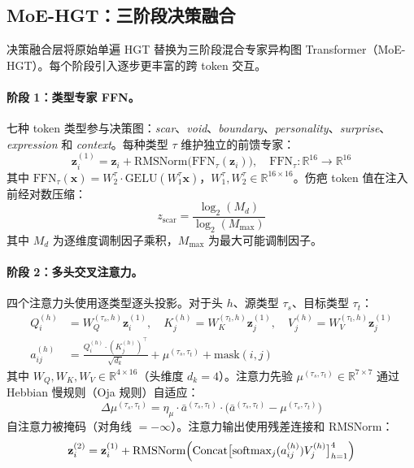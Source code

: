 \documentclass[11pt]{article}
\begin{document}
\subsection{MoE-HGT：三阶段决策融合}

决策融合层将原始单遍 HGT 替换为三阶段混合专家异构图 Transformer（MoE-HGT）。每个阶段引入逐步更丰富的跨 token 交互。

\paragraph{阶段 1：类型专家 FFN。}
七种 token 类型参与决策图：\emph{scar}、\emph{void}、\emph{boundary}、\emph{personality}、\emph{surprise}、\emph{expression} 和 \emph{context}。每种类型 $\tau$ 维护独立的前馈专家：
\begin{equation}
\mathbf{z}_i^{(1)} = \mathbf{z}_i + \text{RMSNorm}\bigl(\text{FFN}_\tau(\mathbf{z}_i)\bigr), \quad \text{FFN}_\tau: \mathbb{R}^{16} \to \mathbb{R}^{16}
\end{equation}
其中 $\text{FFN}_\tau(\mathbf{x}) = W_2^\tau \cdot \text{GELU}(W_1^\tau \mathbf{x})$，$W_1^\tau, W_2^\tau \in \mathbb{R}^{16 \times 16}$。伤疤 token 值在注入前经对数压缩：
\begin{equation}
z_{\text{scar}} = \frac{\log_2(M_d)}{\log_2(M_{\max})}
\end{equation}
其中 $M_d$ 为逐维度调制因子乘积，$M_{\max}$ 为最大可能调制因子。

\paragraph{阶段 2：多头交叉注意力。}
四个注意力头使用逐类型逐头投影。对于头 $h$、源类型 $\tau_s$、目标类型 $\tau_t$：
\begin{align}
Q_i^{(h)} &= W_Q^{(\tau_s, h)} \mathbf{z}_i^{(1)}, \quad K_j^{(h)} = W_K^{(\tau_t, h)} \mathbf{z}_j^{(1)}, \quad V_j^{(h)} = W_V^{(\tau_t, h)} \mathbf{z}_j^{(1)} \\
a_{ij}^{(h)} &= \frac{Q_i^{(h)} \cdot (K_j^{(h)})^\top}{\sqrt{d_k}} + \mu^{(\tau_s, \tau_t)} + \text{mask}(i,j)
\end{align}
其中 $W_Q, W_K, W_V \in \mathbb{R}^{4 \times 16}$（头维度 $d_k = 4$）。注意力先验 $\mu^{(\tau_s, \tau_t)} \in \mathbb{R}^{7 \times 7}$ 通过 Hebbian 慢规则（Oja 规则）自适应：
\begin{equation}
\Delta\mu^{(\tau_s, \tau_t)} = \eta_\mu \cdot \bar{a}^{(\tau_s, \tau_t)} \cdot \bigl(\bar{a}^{(\tau_s, \tau_t)} - \mu^{(\tau_s, \tau_t)}\bigr)
\end{equation}
自注意力被掩码（对角线 $= -\infty$）。注意力输出使用残差连接和 RMSNorm：
\begin{equation}
\mathbf{z}_i^{(2)} = \mathbf{z}_i^{(1)} + \text{RMSNorm}\Bigl(\text{Concat}\bigl[\text{softmax}_j(a_{ij}^{(h)}) V_j^{(h)}\bigr]_{h=1}^4\Bigr)
\end{equation}
\end{document}
